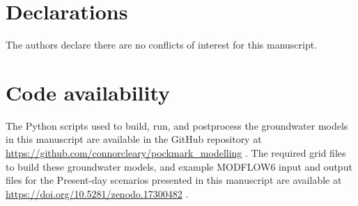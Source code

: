 \documentclass[pdflatex,sn-apa]{sn-jnl}%
\begin{document}
\section*{Declarations}
The authors declare there are no conflicts of interest for this manuscript.

\section*{Code availability}
The Python scripts used to build, run, and postprocess the groundwater models in this manuscript are available in the GitHub repository at \url{https://github.com/connorcleary/pockmark_modelling} \citep{cleary_python_2025}. The required grid files to build these groundwater models, and example MODFLOW6 input and output files for the Present-day scenarios presented in this manuscript are available at \url{https://doi.org/10.5281/zenodo.17300482} \citep{cleary_grid_2025}.


\end{document}

